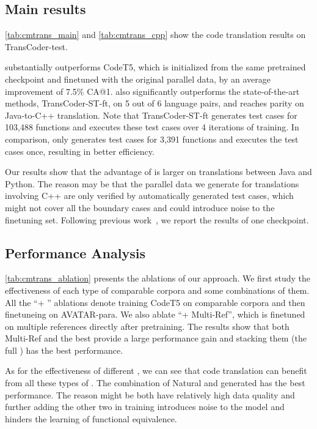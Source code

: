 \subsection{Main results}
\autoref{tab:cmtrans_main} and \autoref{tab:cmtrans_cpp} show the code translation results on TransCoder-test.

\cmtransours substantially outperforms CodeT5, which is initialized from the same pretrained checkpoint and finetuned with the original parallel data, by an average improvement of 7.5\% CA@1.
\cmtransours also significantly outperforms the state-of-the-art methods, TransCoder-ST-ft, on 5 out of 6 language pairs, and reaches parity on Java-to-C++ translation.
Note that TransCoder-ST-ft generates test cases for 103,488 functions and executes these test cases over 4 iterations of training. 
In comparison, \cmtransours only generates test cases for 3,391 functions and executes the test cases once, resulting in better efficiency.

Our results show that the advantage of \cmtransours is larger on translations between Java and Python. The reason may be that the parallel data we generate for translations involving C++ are only verified by automatically generated test cases, which might not cover all the boundary cases and could introduce noise to the finetuning set.
Following previous work~\cite{transcoderST,avatar}, we report the results of one checkpoint. 

\subsection{Performance Analysis}
\autoref{tab:cmtrans_ablation} presents the ablations of our approach. 
We first study the effectiveness of each type of comparable corpora and some combinations of them. All the ``+ \CC'' ablations denote training CodeT5 on comparable corpora and then finetuneing on AVATAR-para.
We also ablate ``+ Multi-Ref'', which is finetuned on multiple references directly after pretraining.
The results show that both Multi-Ref and the best \CC provide a large performance gain and stacking them (the full \cmtransours) has the best performance.

As for the effectiveness of different \CC, we can see that code translation can benefit from all these types of \CC. The combination of Natural and generated \CC has the best performance. The reason might be both \CC have relatively high data quality and further adding the other two \CC in training introduces noise to the model and hinders the learning of functional equivalence.

